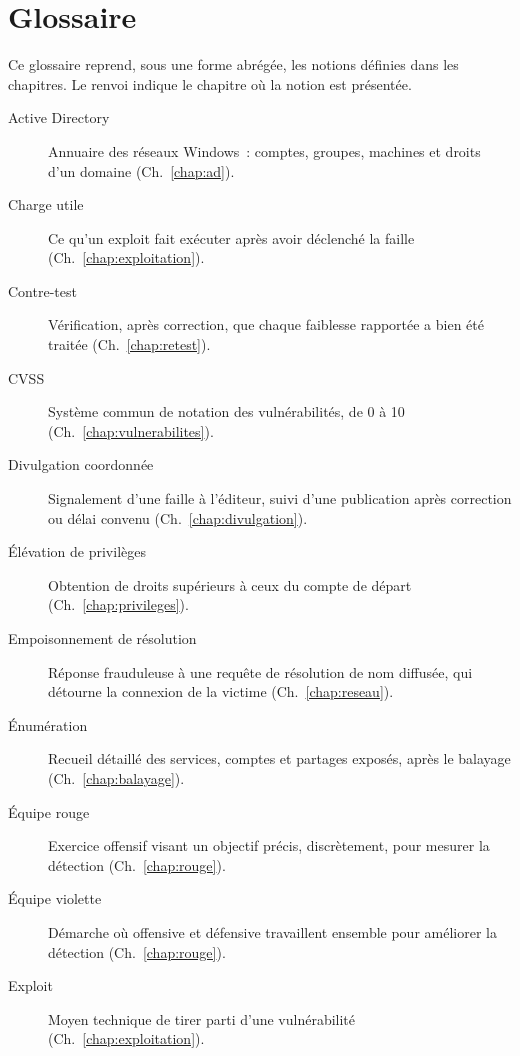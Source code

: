 
\chapter{Glossaire}
\label{ann:glossaire}

Ce glossaire reprend, sous une forme abrégée, les notions définies dans les
chapitres. Le renvoi indique le chapitre où la notion est présentée.

\begin{description}
    \item[Active Directory] Annuaire des réseaux Windows~: comptes, groupes, machines et droits d'un domaine (Ch.~\ref{chap:ad}).
    \item[Charge utile] Ce qu'un exploit fait exécuter après avoir déclenché la faille (Ch.~\ref{chap:exploitation}).
    \item[Contre-test] Vérification, après correction, que chaque faiblesse rapportée a bien été traitée (Ch.~\ref{chap:retest}).
    \item[CVSS] Système commun de notation des vulnérabilités, de 0 à 10 (Ch.~\ref{chap:vulnerabilites}).
    \item[Divulgation coordonnée] Signalement d'une faille à l'éditeur, suivi d'une publication après correction ou délai convenu (Ch.~\ref{chap:divulgation}).
    \item[Élévation de privilèges] Obtention de droits supérieurs à ceux du compte de départ (Ch.~\ref{chap:privileges}).
    \item[Empoisonnement de résolution] Réponse frauduleuse à une requête de résolution de nom diffusée, qui détourne la connexion de la victime (Ch.~\ref{chap:reseau}).
    \item[Énumération] Recueil détaillé des services, comptes et partages exposés, après le balayage (Ch.~\ref{chap:balayage}).
    \item[Équipe rouge] Exercice offensif visant un objectif précis, discrètement, pour mesurer la détection (Ch.~\ref{chap:rouge}).
    \item[Équipe violette] Démarche où offensive et défensive travaillent ensemble pour améliorer la détection (Ch.~\ref{chap:rouge}).
    \item[Exploit] Moyen technique de tirer parti d'une vulnérabilité (Ch.~\ref{chap:exploitation}).

\end{description}
